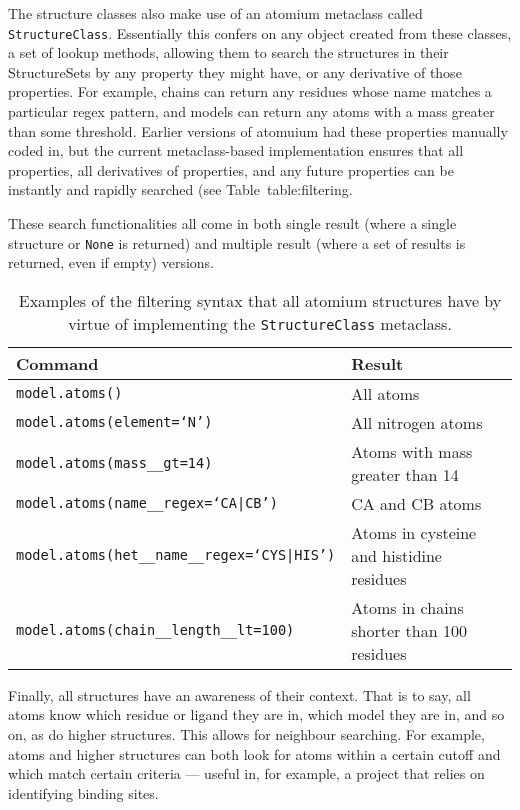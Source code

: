 The structure classes also make use of an atomium metaclass called \texttt{StructureClass}. Essentially this confers on any object created from these classes, a set of lookup methods, allowing them to search the structures in their StructureSets by any property they might have, or any derivative of those properties. For example, chains can return any residues whose name matches a particular regex pattern, and models can return any atoms with a mass greater than some threshold. Earlier versions of atomuium had these properties manually coded in, but the current metaclass-based implementation ensures that all properties, all derivatives of properties, and any future properties can be instantly and rapidly searched (see Table~{table:filtering}.

These search functionalities all come in both single result (where a single structure or \texttt{None} is returned) and multiple result (where a set of results is returned, even if empty) versions.

\begin{table}
\begin{center}
\begin{tabular}{llr} \hline
Command                         & Result \\ \hline
\texttt{model.atoms()}                        & All atoms  \\
\texttt{model.atoms(element=`N')}                 & All nitrogen atoms \\
\texttt{model.atoms(mass\_\_gt=14)}                 & Atoms with mass greater than 14 \\
\texttt{model.atoms(name\_\_regex=`CA|CB')}             & CA and CB atoms  \\
\texttt{model.atoms(het\_\_name\_\_regex=`CYS|HIS')}    & Atoms in cysteine and histidine residues \\
\texttt{model.atoms(chain\_\_length\_\_lt=100)}     & Atoms in chains shorter than 100 residues \\ \hline
\end{tabular}
\end{center}
\caption{\label{tab:filtering}Examples of the filtering syntax that all atomium structures have by virtue of implementing the \texttt{StructureClass} metaclass.} 
\end{table}

Finally, all structures have an awareness of their context. That is to say, all atoms know which residue or ligand they are in, which model they are in, and so on, as do higher structures. This allows for neighbour searching. For example, atoms and higher structures can both look for atoms within a certain cutoff and which match certain criteria --- useful in, for example, a project that relies on identifying binding sites.

